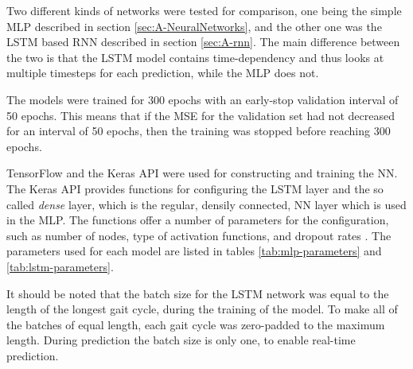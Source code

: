 \documentclass[../main.tex]{subfiles}
\begin{document}
Two different kinds of networks were tested for comparison, one being the simple \ac{MLP} described in section \ref{sec:A-NeuralNetworks}, and the other one was the \ac{LSTM} based \ac{RNN} described in section \ref{sec:A-rnn}.
The main difference between the two is that the \ac{LSTM} model contains time-dependency and thus looks at multiple timesteps for each prediction, while the \ac{MLP} does not.

The models were trained for 300 epochs with an early-stop validation interval of 50 epochs.
This means that if the \ac{MSE} for the validation set had not decreased for an interval of 50 epochs, then the training was stopped before reaching 300 epochs.

TensorFlow \cite{tensorflow2015-whitepaper} and the Keras API \cite{chollet2015keras} were used for constructing and training the \ac{NN}.
The Keras API provides functions for configuring the \ac{LSTM} layer and the so called \textit{dense} layer, which is the regular, densily connected, \ac{NN} layer which is used in the \ac{MLP}.
The functions offer a number of parameters for the configuration, such as number of nodes, type of activation functions, and dropout rates \cite{chollet2015keras}.
The parameters used for each model are listed in tables \ref{tab:mlp-parameters} and \ref{tab:lstm-parameters}.


It should be noted that the batch size for the \ac{LSTM} network was equal to the length of the longest gait cycle, during the training of the model.
To make all of the batches of equal length, each gait cycle was zero-padded to the maximum length.
During prediction the batch size is only one, to enable real-time prediction.
\end{document}
